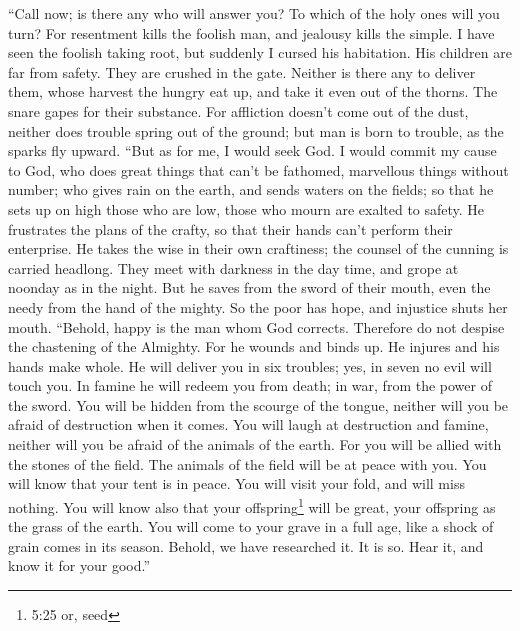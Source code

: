  ``Call now; is there any who will answer you? To which of
the holy ones will you turn?  For resentment kills the
foolish man, and jealousy kills the simple.  I have seen the
foolish taking root, but suddenly I cursed his habitation. 
His children are far from safety. They are crushed in the gate. Neither
is there any to deliver them,  whose harvest the hungry eat
up, and take it even out of the thorns. The snare gapes for their
substance.  For affliction doesn't come out of the dust,
neither does trouble spring out of the ground;  but man is
born to trouble, as the sparks fly upward.  ``But as for me,
I would seek God. I would commit my cause to God,  who does
great things that can't be fathomed, marvellous things without number;
 who gives rain on the earth, and sends waters on the
fields;  so that he sets up on high those who are low,
those who mourn are exalted to safety.  He frustrates the
plans of the crafty, so that their hands can't perform their enterprise.
 He takes the wise in their own craftiness; the counsel of
the cunning is carried headlong.  They meet with darkness
in the day time, and grope at noonday as in the night.  But
he saves from the sword of their mouth, even the needy from the hand of
the mighty.  So the poor has hope, and injustice shuts her
mouth.  ``Behold, happy is the man whom God corrects.
Therefore do not despise the chastening of the Almighty. 
For he wounds and binds up. He injures and his hands make whole.
 He will deliver you in six troubles; yes, in seven no evil
will touch you.  In famine he will redeem you from death;
in war, from the power of the sword.  You will be hidden
from the scourge of the tongue, neither will you be afraid of
destruction when it comes.  You will laugh at destruction
and famine, neither will you be afraid of the animals of the earth.
 For you will be allied with the stones of the field. The
animals of the field will be at peace with you.  You will
know that your tent is in peace. You will visit your fold, and will miss
nothing.  You will know also that your offspring\footnote{5:25
  or, seed} will be great, your offspring as the grass of the earth.
 You will come to your grave in a full age, like a shock of
grain comes in its season.  Behold, we have researched it.
It is so. Hear it, and know it for your good.''

